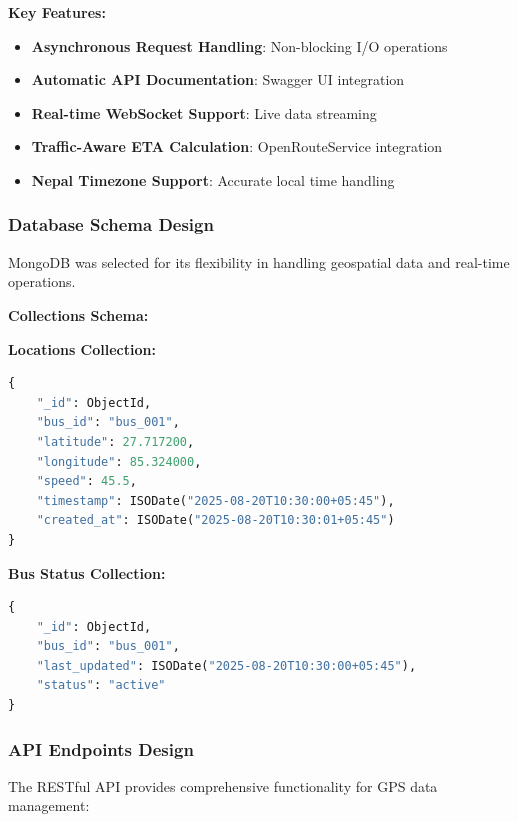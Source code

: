 \documentclass[12pt,a4paper]{article}
\begin{document}
\textbf{Key Features:}
\begin{itemize}
    \item \textbf{Asynchronous Request Handling}: Non-blocking I/O operations
    \item \textbf{Automatic API Documentation}: Swagger UI integration
    \item \textbf{Real-time WebSocket Support}: Live data streaming
    \item \textbf{Traffic-Aware ETA Calculation}: OpenRouteService integration
    \item \textbf{Nepal Timezone Support}: Accurate local time handling
\end{itemize}

\subsubsection{Database Schema Design}

MongoDB was selected for its flexibility in handling geospatial data and real-time operations.

\textbf{Collections Schema:}

\textbf{Locations Collection:}
\begin{lstlisting}[language=Python, caption=Location Document Schema]
{
    "_id": ObjectId,
    "bus_id": "bus_001",
    "latitude": 27.717200,
    "longitude": 85.324000,
    "speed": 45.5,
    "timestamp": ISODate("2025-08-20T10:30:00+05:45"),
    "created_at": ISODate("2025-08-20T10:30:01+05:45")
}
\end{lstlisting}

\textbf{Bus Status Collection:}
\begin{lstlisting}[language=Python, caption=Bus Status Document Schema]
{
    "_id": ObjectId,
    "bus_id": "bus_001",
    "last_updated": ISODate("2025-08-20T10:30:00+05:45"),
    "status": "active"
}
\end{lstlisting}

\subsubsection{API Endpoints Design}

The RESTful API provides comprehensive functionality for GPS data management:
\end{document}
